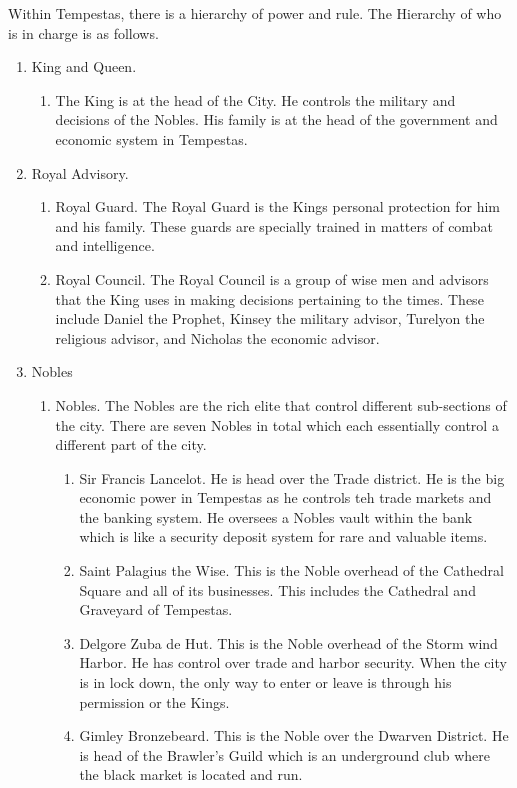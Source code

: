 Within Tempestas, there is a hierarchy of power and rule. The Hierarchy of who is in charge is as follows.
\begin{enumerate}
	\item King and Queen.
	\begin{enumerate}
		\item The King is at the head of the City. He controls the military and decisions of the Nobles. His family is at the head of the government and economic system in Tempestas.
	\end{enumerate}
	\item Royal Advisory.
	\begin{enumerate}
		\item Royal Guard. The Royal Guard is the Kings personal protection for him and his family. These guards are specially trained in matters of combat and intelligence.
		\item Royal Council. The Royal Council is a group of wise men and advisors that the King uses in making decisions pertaining to the times. These include Daniel the Prophet, Kinsey the military advisor, Turelyon the religious advisor, and Nicholas the economic advisor. 
	\end{enumerate}
	\item Nobles
	\begin{enumerate}
		\item Nobles. The Nobles are the rich elite that control different sub-sections of the city. There are seven Nobles in total which each essentially control a different part of the city.
		\begin{enumerate}
			\item Sir Francis Lancelot. He is head over the Trade district. He is the big economic power in Tempestas as he controls teh trade markets and the banking system. He oversees a Nobles vault within the bank which is like a security deposit system for rare and valuable items.
			\item Saint Palagius the Wise. This is the Noble overhead of the Cathedral Square and all of its businesses. This includes the Cathedral and Graveyard of Tempestas.
			\item Delgore Zuba de Hut. This is the Noble overhead of the Storm wind Harbor. He has control over trade and harbor security. When the city is in lock down, the only way to enter or leave is through his permission or the Kings. 
			\item Gimley Bronzebeard. This is the Noble over the Dwarven District. He is head of the Brawler's Guild which is an underground club where the black market is located and run.

\end{enumerate}
\end{enumerate}
\end{enumerate}
